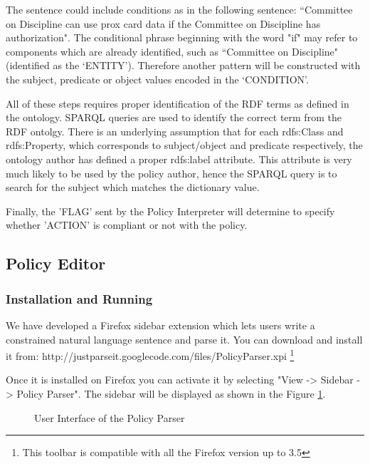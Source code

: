 \documentclass{llncs}
\begin{document}
The sentence could include conditions as in the following sentence: ``Committee on Discipline can use prox card data if the Committee on Discipline has authorization". The conditional phrase beginning with the word "if" may refer to components which are already identified, such as ``Committee on Discipline" (identified as the `ENTITY'). Therefore another pattern will be constructed with the subject, predicate or object values encoded in the `CONDITION'.

All of these steps requires proper identification of the RDF terms as defined in the ontology. SPARQL queries are used to identify the correct term from the RDF ontolgy. There is an underlying assumption that for each rdfs:Class and rdfs:Property, which corresponds to subject/object and predicate respectively, the ontology author has defined a proper rdfs:label attribute. This attribute is very much likely to be used by the policy author, hence the SPARQL query is to search for the subject which matches the dictionary value.

Finally, the 'FLAG' sent by the Policy Interpreter will determine to specify whether 'ACTION' is compliant or not with the policy.


\subsection{Policy Editor}

\subsubsection{Installation and Running}

We have developed a Firefox sidebar extension which lets users write a constrained natural language sentence and parse it. You can download and install it from:
http://justparseit.googlecode.com/files/PolicyParser.xpi
\footnote{This toolbar is compatible with all the Firefox version up to 3.5}

Once it is installed on Firefox you can activate it by selecting "View -> Sidebar -> Policy Parser".
The sidebar will be displayed as shown in the Figure \ref{fig-ui}.

\begin{figure}[!h]
  \centerline{}
  \caption{User Interface of the Policy Parser}
  \label{fig-ui}
\end{figure}
\end{document}
